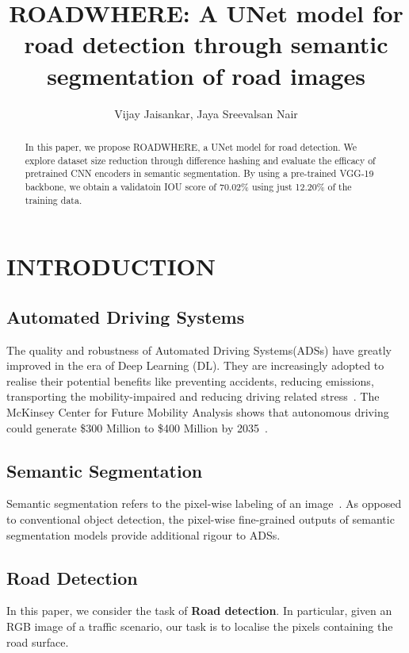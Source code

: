 \documentclass[letterpaper, 10 pt, conference]{ieeeconf}  %
\title{\LARGE \bf
    ROADWHERE: A UNet model for road detection through semantic segmentation of road images
}
\author{Vijay Jaisankar, Jaya Sreevalsan Nair}
\begin{document}
\maketitle
\thispagestyle{empty}
\pagestyle{empty}


\begin{abstract}
In this paper, we propose ROADWHERE, a UNet model for road detection. We explore dataset size reduction through difference hashing and evaluate the efficacy of pretrained CNN encoders in semantic segmentation. By using a pre-trained VGG-19 backbone, we obtain a validatoin IOU score of 70.02\% using just 12.20\% of the training data. 
\end{abstract}

\section{INTRODUCTION}
\label{intro}

\subsection{Automated Driving Systems}
\label{intro:ads}
The quality and robustness of Automated Driving Systems(ADSs) have greatly improved in the era of Deep Learning (DL). They are increasingly adopted to realise their potential benefits like preventing accidents, reducing emissions, transporting the mobility-impaired and reducing driving related stress~\cite{9046805}. 
The McKinsey Center for Future Mobility Analysis shows that autonomous driving could generate \$300 Million to \$400 Million by 2035~\cite{Deichmann_Ebel_Heineke_Heuss_Kellner_Steiner_2023}. 

\subsection{Semantic Segmentation}
\label{intro:semseg}
Semantic segmentation refers to the pixel-wise labeling of an image~\cite{doi:10.1080/08839514.2022.2032924}.
As opposed to conventional object detection, the pixel-wise fine-grained outputs of semantic segmentation models provide additional rigour to ADSs. 

\subsection{Road Detection}
\label{intro:road}
In this paper, we consider the task of \textbf{Road detection}. In particular, given an RGB image of a traffic scenario, our task is to localise the pixels containing the road surface.
\end{document}
